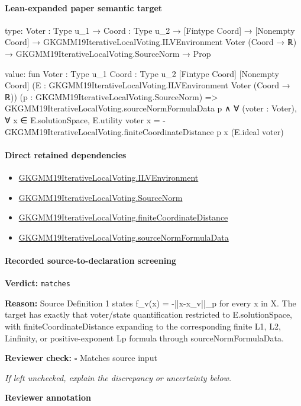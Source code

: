 \documentclass[10pt]{article}
\newcommand{\reviewerbox}{%
  \par\noindent\fbox{\parbox{0.96\linewidth}{\rule{0pt}{0.38in}}}\par
}
\newcommand{\reviewmatch}[1]{%
  \par\noindent\textbf{Reviewer check:} $\square$\; #1\par
  \noindent\emph{If left unchecked, explain the discrepancy or uncertainty below.}\par
}
\begin{document}
\paragraph{Lean-expanded paper semantic target}
\begin{ReviewVerbatim}
type:
{Voter : Type u_1} →
  {Coord : Type u_2} →
    [Fintype Coord] →
      [Nonempty Coord] →
        GKGMM19IterativeLocalVoting.ILVEnvironment Voter (Coord → ℝ) → GKGMM19IterativeLocalVoting.SourceNorm → Prop

value:
fun {Voter : Type u_1} {Coord : Type u_2} [Fintype Coord] [Nonempty Coord]
    (E : GKGMM19IterativeLocalVoting.ILVEnvironment Voter (Coord → ℝ)) (p : GKGMM19IterativeLocalVoting.SourceNorm) =>
  GKGMM19IterativeLocalVoting.sourceNormFormulaData p ∧
    ∀ (voter : Voter),
      ∀ x ∈ E.solutionSpace,
        E.utility voter x = -GKGMM19IterativeLocalVoting.finiteCoordinateDistance p x (E.ideal voter)
\end{ReviewVerbatim}

\paragraph{Direct retained dependencies}
\begin{itemize}\raggedright
\item \hyperlink{governing-declaration-df2ca62df1846667}{GKGMM19\allowbreak{}Iterative\allowbreak{}Local\allowbreak{}Voting.\allowbreak{}ILV\allowbreak{}Environment}
\item \hyperlink{governing-declaration-6fa4ab9852321b03}{GKGMM19\allowbreak{}Iterative\allowbreak{}Local\allowbreak{}Voting.\allowbreak{}Source\allowbreak{}Norm}
\item \hyperlink{governing-declaration-54228ebaec750c58}{GKGMM19\allowbreak{}Iterative\allowbreak{}Local\allowbreak{}Voting.\allowbreak{}finite\allowbreak{}Coordinate\allowbreak{}Distance}
\item \hyperlink{paper-prerequisite-d7774e2d1adfed0f}{GKGMM19\allowbreak{}Iterative\allowbreak{}Local\allowbreak{}Voting.\allowbreak{}source\allowbreak{}Norm\allowbreak{}Formula\allowbreak{}Data}
\end{itemize}
\paragraph{Recorded source-to-declaration screening}
\textbf{Verdict:} \texttt{matches}
\\
{\raggedright
\textbf{Reason:} Source Definition 1 states f\_\allowbreak{}v(x) = -\allowbreak{}||x-\allowbreak{}x\_\allowbreak{}v||\_\allowbreak{}p for every x in X.\allowbreak{} The target has exactly that voter/\allowbreak{}state quantification restricted to E.\allowbreak{}solutionSpace, with finiteCoordinateDistance expanding to the corresponding finite L1, L2, Linfinity, or positive-\allowbreak{}exponent Lp formula through sourceNormFormulaData.\allowbreak{}
\par}
\reviewmatch{Matches source input}
\noindent\textbf{Reviewer annotation}\par
\reviewerbox
\clearpage
\hypertarget{paper-prerequisite-b9eb2782bc57cac0}{}
\end{document}
